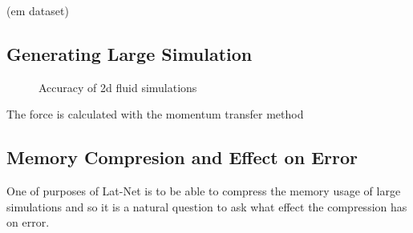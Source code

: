 \documentclass{article}
\begin{document}
(em dataset)

\subsection{Generating Large Simulation}

\begin{figure}[!t]
\centering
{}
\caption{Accuracy of 2d fluid simulations }
\label{fig:bouncing_balls_error_3}
\end{figure}

The force is calculated with the momentum transfer method \cite{guo2013lattice}

\subsection{Memory Compresion and Effect on Error}

One of purposes of Lat-Net is to be able to compress the memory usage of large simulations and so it is a natural question to ask what effect the compression has on error.
\end{document}
